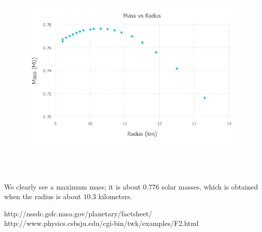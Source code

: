 \documentclass{article}
\begin{document}
\begin{figure}[H]
	\includegraphics[width=6in,height=4in]{"MvR2"}
\end{figure}

We clearly see a maximum mass; it is about $0.776$ solar masses, which is obtained when the radius is about $10.3$ kilometers.


\begin{thebibliography}{9}
	http://nssdc.gsfc.nasa.gov/planetary/factsheet/
	http://www.physics.csbsju.edu/cgi-bin/twk/examples/F2.html
\end{thebibliography}
\end{document}
